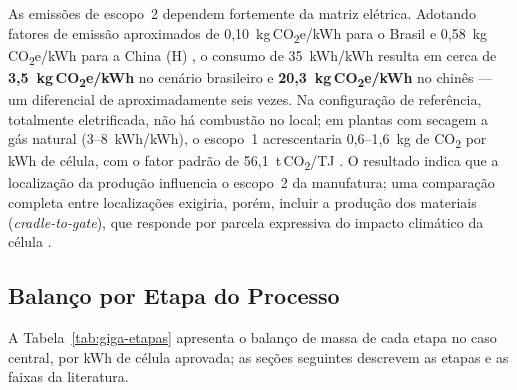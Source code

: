 As emissões de escopo~2 dependem fortemente da matriz elétrica. Adotando fatores
de emissão aproximados de 0,10~kg\,CO\textsubscript{2}e/kWh para o Brasil e
0,58~kg\,CO\textsubscript{2}e/kWh para a China (H) , o consumo de 35~kWh/kWh resulta em cerca
de \textbf{3,5~kg\,CO\textsubscript{2}e/kWh} no cenário brasileiro e
\textbf{20,3~kg\,CO\textsubscript{2}e/kWh} no chinês — um diferencial de
aproximadamente seis vezes. Na configuração de referência, totalmente
eletrificada, não há combustão no local; em plantas com secagem a gás natural
(3--8~kWh/kWh), o escopo~1 acrescentaria 0,6--1,6~kg de CO\textsubscript{2} por
kWh de célula, com o fator padrão de 56,1~t\,CO\textsubscript{2}/TJ \cite{ipcc2006}. O resultado
indica que a localização da produção influencia o escopo~2 da manufatura; uma
comparação completa entre localizações exigiria, porém, incluir a produção dos
materiais (\textit{cradle-to-gate}), que responde por parcela expressiva do
impacto climático da célula \cite{dai2019}.

\subsection{Balanço por Etapa do Processo}
\label{subsec:giga-etapas}

A Tabela~\ref{tab:giga-etapas} apresenta o balanço de massa de cada etapa no caso
central, por kWh de célula aprovada; as seções seguintes descrevem as etapas e as
faixas da literatura.

